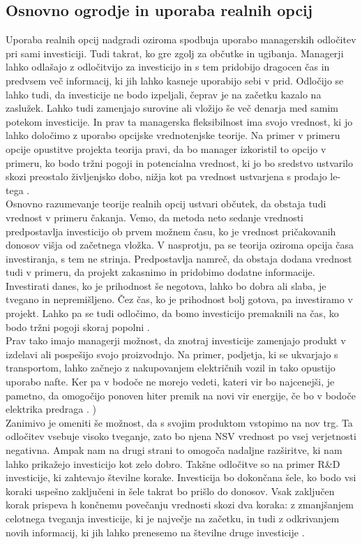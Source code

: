 \subsection{Osnovno ogrodje in uporaba realnih opcij}
Uporaba realnih opcij nadgradi oziroma spodbuja uporabo managerskih odločitev pri sami investiciji. Tudi takrat, ko gre zgolj za občutke in ugibanja. Managerji lahko odlašajo z odločitvijo za investicijo in s tem pridobijo dragocen čas in predvsem več informacij, ki jih lahko kasneje uporabijo sebi v prid. Odločijo se lahko tudi, da investicije ne bodo izpeljali, čeprav je na začetku kazalo na zaslužek. Lahko tudi zamenjajo surovine ali vložijo še več denarja med samim potekom investicije. In prav ta managerska fleksibilnost ima svojo vrednost, ki jo lahko določimo z uporabo opcijske vrednotenjske teorije. Na primer v primeru opcije opustitve projekta teorija pravi, da bo manager izkoristil to opcijo v primeru, ko bodo tržni pogoji in potencialna vrednost, ki jo bo sredstvo ustvarilo skozi preostalo življenjsko dobo, nižja kot pa vrednost ustvarjena s prodajo le-tega \cite[str. 33]{Brach}.  \\

Osnovno razumevanje teorije realnih opcij ustvari občutek, da obstaja tudi vrednost v primeru čakanja. Vemo, da metoda neto sedanje vrednosti predpostavlja investicijo ob prvem možnem času, ko je vrednost pričakovanih donosov višja od začetnega vložka. V nasprotju, pa se teorija oziroma opcija časa investiranja, s tem ne strinja. Predpostavlja namreč, da obstaja dodana vrednost tudi v primeru, da projekt zakasnimo in pridobimo dodatne informacije. Investirati danes, ko je prihodnost še negotova, lahko bo dobra ali slaba, je tvegano in nepremišljeno. Čez čas, ko je prihodnost bolj gotova, pa investiramo v projekt. Lahko pa se tudi odločimo, da bomo investicijo premaknili na čas, ko bodo tržni pogoji skoraj popolni \cite[str. 34, 35]{Brach}. \\

Prav tako imajo managerji možnost, da znotraj investicije zamenjajo produkt v izdelavi ali pospešijo svojo proizvodnjo. Na primer, podjetja, ki se ukvarjajo s transportom, lahko začnejo z nakupovanjem električnih vozil in tako opustijo uporabo nafte. Ker pa v bodoče ne morejo vedeti, kateri vir bo najcenejši, je pametno, da omogočijo ponoven hiter premik na novi vir energije, če bo v bodoče elektrika predraga \cite[str. 37]{Brach}. )\\

Zanimivo je omeniti še možnost, da s svojim produktom vstopimo na nov trg. Ta odločitev vsebuje visoko tveganje, zato bo njena NSV vrednost po vsej verjetnosti negativna. Ampak nam na drugi strani to omogoča nadaljne razširitve, ki nam lahko prikažejo investicijo kot zelo dobro. Takšne odločitve so na primer R\&D investicije, ki zahtevajo številne korake. Investicija bo dokončana šele, ko bodo vsi koraki uspešno zaključeni in šele takrat bo prišlo do donosov. Vsak zaključen korak prispeva h končnemu povečanju vrednosti skozi dva koraka: z zmanjšanjem celotnega tveganja investicije, ki je največje na začetku, in tudi z odkrivanjem novih informacij, ki jih lahko prenesemo na številne druge investicije \cite[str. 38]{Brach}.\\

